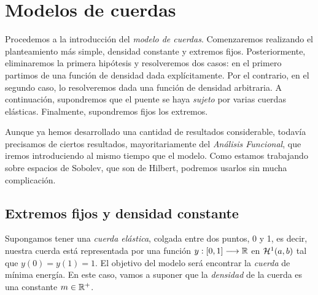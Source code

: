 \section{Modelos de cuerdas}

Procedemos a la introducción del \textit{modelo de cuerdas}. Comenzaremos realizando el planteamiento más simple, densidad constante y extremos fijos. Posteriormente, eliminaremos la primera hipótesis y resolveremos dos casos: en el primero partimos de una función de densidad dada explícitamente. Por el contrario, en el segundo caso, lo resolveremos dada una función de densidad arbitraria. A continuación, supondremos que el puente se haya \textit{sujeto} por varias cuerdas elásticas. Finalmente, supondremos fijos los extremos.

Aunque ya hemos desarrollado una cantidad de resultados considerable, todavía precisamos de ciertos resultados, mayoritariamente del \textit{Análisis Funcional}, que iremos introduciendo al mismo tiempo que el modelo. Como estamos trabajando sobre espacios de Sobolev, que son de Hilbert, podremos usarlos sin mucha complicación.

\subsection{Extremos fijos y densidad constante}

Supongamos tener una \textit{cuerda elástica}, colgada entre dos puntos, 0 y 1, es decir, nuestra cuerda está representada por una función $y : [0,1] \longrightarrow \mathbb{R}$ en $\mathcal{H}^{ 1 }(a,b)$ tal que $y(0)=y(1)=1$. El objetivo del modelo será encontrar la \textit{cuerda} de mínima energía. En este caso, vamos a suponer que la \textit{densidad} de la cuerda es una constante $m\in\mathbb{R}^+$. 

